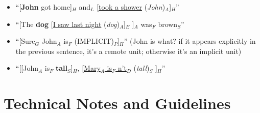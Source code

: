 \documentclass[11pt]{article}
\newcommand{\dd}[1]{{\color{blue}{#1}}}
\newcommand{\dcom}[1]{\textit{\color{blue}{#1}}}
\newcommand{\oa}[1]{{\color{blue}{OA: #1}}}
\newcommand{\nss}[1]{}
\newcommand{\rem}[1]{{(\it #1})}
\begin{document}
\begin{enumerate}
\begin{itemize}
\item	``[{\bf John} got home]$_H$ and$_L$ [\underline{took a shower} \rem{John}$_A$]$_{H}$''
\item	``[The {\bf dog} [\underline{I saw last night} \rem{dog}$_A$]$_{E}$ ]$_A$ was$_F$ brown$_S$''
\item 	``[Sure$_G$ John$_A$ is$_F$ (IMPLICIT)$_P$]$_H$'' (John is what? if it appears explicitly in the previous sentence, it's a remote unit; otherwise it's an implicit unit)
\item   ``[[John$_A$ is$_F$ {\bf tall}$_S$]$_H$, [\underline{Mary$_A$ is$_F$ n't$_D$} \rem{tall}$_S$ ]$_H$''
\end{itemize}

\end{enumerate}

\section{Technical Notes and Guidelines}
\end{document}
